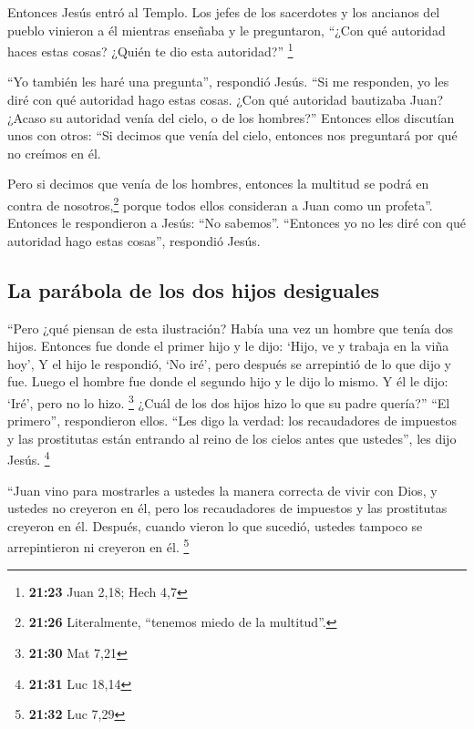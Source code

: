  Entonces Jesús entró al Templo. Los jefes de los
sacerdotes y los ancianos del pueblo vinieron a él mientras enseñaba y
le preguntaron, ``¿Con qué autoridad haces estas cosas? ¿Quién te dio
esta autoridad?'' \footnote{\textbf{21:23} Juan 2,18; Hech 4,7}

 ``Yo también les haré una pregunta'', respondió Jesús.
``Si me responden, yo les diré con qué autoridad hago estas cosas.
 ¿Con qué autoridad bautizaba Juan? ¿Acaso su autoridad
venía del cielo, o de los hombres?'' Entonces ellos discutían unos con
otros: ``Si decimos que venía del cielo, entonces nos preguntará por qué
no creímos en él.

 Pero si decimos que venía de los hombres, entonces la
multitud se podrá en contra de nosotros,\footnote{\textbf{21:26}
  Literalmente, ``tenemos miedo de la multitud''.} porque todos ellos
consideran a Juan como un profeta''.  Entonces le
respondieron a Jesús: ``No sabemos''. ``Entonces yo no les diré con qué
autoridad hago estas cosas'', respondió Jesús.

\hypertarget{la-paruxe1bola-de-los-dos-hijos-desiguales}{%
\subsection{La parábola de los dos hijos
desiguales}\label{la-paruxe1bola-de-los-dos-hijos-desiguales}}

 ``Pero ¿qué piensan de esta ilustración? Había una vez
un hombre que tenía dos hijos. Entonces fue donde el primer hijo y le
dijo: `Hijo, ve y trabaja en la viña hoy',  Y el hijo le
respondió, `No iré', pero después se arrepintió de lo que dijo y fue.
 Luego el hombre fue donde el segundo hijo y le dijo lo
mismo. Y él le dijo: `Iré', pero no lo hizo. \footnote{\textbf{21:30}
  Mat 7,21}  ¿Cuál de los dos hijos hizo lo que su padre
quería?'' ``El primero'', respondieron ellos. ``Les digo la verdad: los
recaudadores de impuestos y las prostitutas están entrando al reino de
los cielos antes que ustedes'', les dijo Jesús. \footnote{\textbf{21:31}
  Luc 18,14}

 ``Juan vino para mostrarles a ustedes la manera correcta
de vivir con Dios, y ustedes no creyeron en él, pero los recaudadores de
impuestos y las prostitutas creyeron en él. Después, cuando vieron lo
que sucedió, ustedes tampoco se arrepintieron ni creyeron en él.
\footnote{\textbf{21:32} Luc 7,29}


